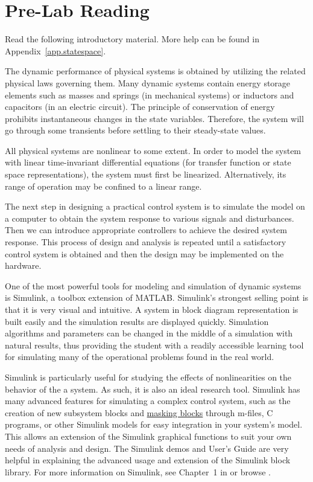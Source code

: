 \section{Pre-Lab Reading}
Read the following introductory material.  More help can be found in Appendix~\ref{app.statespace}.
\par
The dynamic performance of physical systems is obtained by utilizing the related physical laws governing them.  Many dynamic systems contain energy storage elements such as masses and springs (in mechanical systems) or inductors and capacitors (in an electric circuit).  The principle of conservation of energy prohibits instantaneous changes in the state variables. Therefore, the system will go through some transients before settling to their steady-state values.
\par
All physical systems are nonlinear to some extent.  In order to model the system with linear time-invariant differential equations (for transfer function or state space representations), the system must first be linearized.  Alternatively, its range of operation may be confined to a linear range.
\par
The next step in designing a practical control system is to simulate the model on a computer to obtain the system response to various signals and disturbances.  Then we can introduce appropriate controllers to achieve the desired system response.  This process of design and analysis is repeated until a satisfactory control system is obtained and then the design may be implemented on the hardware.
\par
One of the most powerful tools for modeling and simulation of dynamic systems is Simulink, a toolbox extension of MATLAB.  Simulink's strongest selling point is that it is very visual and intuitive.  A system in block diagram representation is built easily and the simulation results are displayed quickly.  Simulation algorithms and parameters can be changed in the middle of a simulation with natural results, thus providing the student with a readily accessible learning tool for simulating many of the operational problems found in the real world.
\par
Simulink is particularly useful for studying the effects of nonlinearities on the behavior of the a system.  As such, it is also an ideal research tool.  Simulink has many advanced features for simulating a complex control system, such as the creation of new subsystem blocks and \uline{masking blocks} through m-files, C programs, or other Simulink models for easy integration in your system's model.  This allows an extension of the Simulink graphical functions to suit your own needs of analysis and design.  The Simulink demos and User's Guide are very helpful in explaining the advanced usage and extension of the Simulink block library.  For more information on Simulink, see Chapter~1 in \cite{saadatbook} or browse \cite{saadatsite}.

